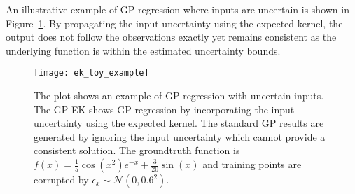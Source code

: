 \documentclass[letterpaper, 10 pt, journal, twoside]{IEEEtran}  %
\newtheorem{example}{Example}
\begin{document}
 An illustrative example of GP regression where inputs are uncertain is shown in Figure~\ref{fig:ek_toy_eg}. By propagating the input uncertainty using the expected kernel, the output does not follow the observations exactly yet remains consistent as the underlying function is within the estimated uncertainty bounds.

\begin{figure}
  \centering 
  \texttt{[image: ek\_toy\_example]}
  \caption{The plot shows an example of GP regression with uncertain inputs. The GP-EK shows GP regression by incorporating the input uncertainty using the expected kernel. The standard GP results are generated by ignoring the input uncertainty which cannot provide a consistent solution. The groundtruth function is \mbox{$f(x) = \frac{1}{5} \cos(x^2) e^{-x} + \frac{3}{20} \sin(x)$} and training points are corrupted by $\epsilon_x \sim \mathcal{N}(0,0.6^2)$.}
  \label{fig:ek_toy_eg}
\end{figure}
\end{document}
